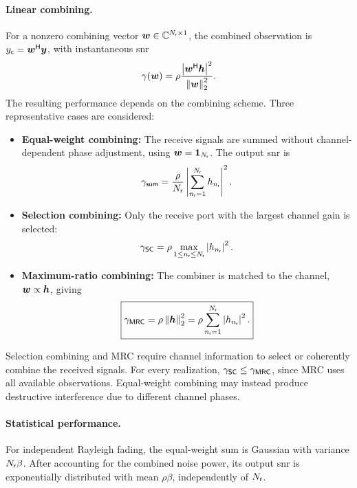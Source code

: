 \paragraph{Linear combining.}
For a nonzero combining vector $\bm{w}\in\mathbb{C}^{N_{\mathsf{r}}\times1}$, the combined observation is $y_{\mathsf c}={\bm{w}}^{\mathsf{H}}\bm{y}$, with instantaneous \ac{snr}
\begin{equation}\label{eq:rxcombining}
	\gamma(\bm{w})
	=\rho\frac{\left|{\bm{w}}^{\mathsf{H}}\bm{h}\right|^2}
	{\left\|\bm{w}\right\|_2^2}.
\end{equation}
The resulting performance depends on the combining scheme. Three representative cases are considered:

\begin{itemize}
	\item \textbf{Equal-weight combining:} The receive signals are summed without channel-dependent phase adjustment, using $\bm{w}=\bm{1}_{N_{\mathsf{r}}}$. The output \ac{snr} is
	\begin{equation*}
		\gamma_{\mathsf{sum}}
		=\frac{\rho}{N_{\mathsf{r}}}
		\left|\sum_{n_{\mathsf{r}}=1}^{N_{\mathsf{r}}}h_{n_{\mathsf{r}}}\right|^2.
	\end{equation*}
	
	\item \textbf{Selection combining:} Only the receive port with the largest channel gain is selected:
	\begin{equation*}
		\gamma_{\mathsf{SC}}
		=\rho\max_{1\leq n_{\mathsf{r}}\leq N_{\mathsf{r}}}\left|h_{n_{\mathsf{r}}}\right|^2.
	\end{equation*}
	
	\item \textbf{Maximum-ratio combining:} The combiner is matched to the channel, $\bm{w}\propto\bm{h}$, giving
	\begin{equation}\label{eq:mrcsnr}
		\boxed{
			\gamma_{\mathsf{MRC}}
			=\rho\left\|\bm{h}\right\|_2^2
			=\rho\sum_{n_{\mathsf{r}}=1}^{N_{\mathsf{r}}}\left|h_{n_{\mathsf{r}}}\right|^2.
		}
	\end{equation}
\end{itemize}
%
Selection combining and MRC require channel information to select or coherently combine the received signals. For every realization, $\gamma_{\mathsf{SC}}\leq\gamma_{\mathsf{MRC}}$, since MRC uses all available observations. Equal-weight combining may instead produce destructive interference due to different channel phases.

\paragraph{Statistical performance.}
For independent Rayleigh fading, the equal-weight sum is Gaussian with variance $N_{\mathsf{r}}\beta$. After accounting for the combined noise power, its output \ac{snr} is exponentially distributed with mean $\rho\beta$, independently of $N_{\mathsf{r}}$.

